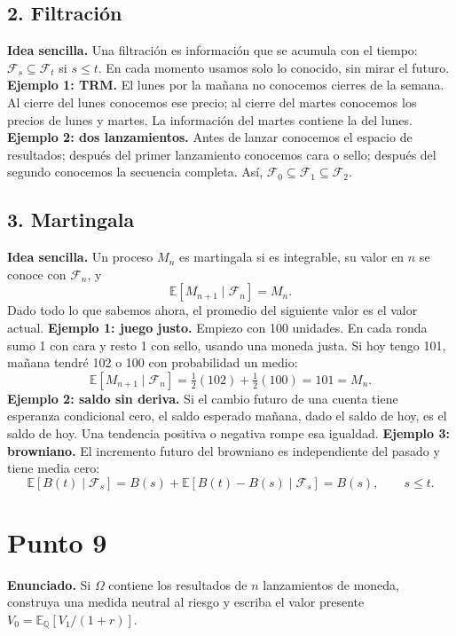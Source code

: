 \documentclass[11pt, a4paper]{article}
\begin{document}
\subsection*{2. Filtración}
\textbf{Idea sencilla.} Una filtración es información que se acumula con el tiempo: \(\mathcal{F}_s\subseteq\mathcal{F}_t\) si \(s\le t\). En cada momento usamos solo lo conocido, sin mirar el futuro.
\textbf{Ejemplo 1: TRM.} El lunes por la mañana no conocemos cierres de la semana. Al cierre del lunes conocemos ese precio; al cierre del martes conocemos los precios de lunes y martes. La información del martes contiene la del lunes.
\textbf{Ejemplo 2: dos lanzamientos.} Antes de lanzar conocemos el espacio de resultados; después del primer lanzamiento conocemos cara o sello; después del segundo conocemos la secuencia completa. Así, \(\mathcal{F}_0\subseteq\mathcal{F}_1\subseteq\mathcal{F}_2\).

\subsection*{3. Martingala}
\textbf{Idea sencilla.} Un proceso \(M_n\) es martingala si es integrable, su valor en \(n\) se conoce con \(\mathcal{F}_n\), y
\[
\mathbb{E}[M_{n+1}\mid\mathcal{F}_n]=M_n.
\]
Dado todo lo que sabemos ahora, el promedio del siguiente valor es el valor actual.
\textbf{Ejemplo 1: juego justo.} Empiezo con 100 unidades. En cada ronda sumo 1 con cara y resto 1 con sello, usando una moneda justa. Si hoy tengo 101, mañana tendré 102 o 100 con probabilidad un medio:
\[
\mathbb{E}[M_{n+1}\mid\mathcal{F}_n]=\tfrac12(102)+\tfrac12(100)=101=M_n.
\]
\textbf{Ejemplo 2: saldo sin deriva.} Si el cambio futuro de una cuenta tiene esperanza condicional cero, el saldo esperado mañana, dado el saldo de hoy, es el saldo de hoy. Una tendencia positiva o negativa rompe esa igualdad.
\textbf{Ejemplo 3: browniano.} El incremento futuro del browniano es independiente del pasado y tiene media cero:
\[
\mathbb{E}[B(t)\mid\mathcal{F}_s]
=B(s)+\mathbb{E}[B(t)-B(s)\mid\mathcal{F}_s]=B(s),\qquad s\le t.
\]
\newpage
\section*{Punto 9}
\textbf{Enunciado.} Si \(\Omega\) contiene los resultados de \(n\) lanzamientos de moneda, construya una medida neutral al riesgo y escriba el valor presente \(V_0=\mathbb{E}_{\mathbb{Q}}[V_1/(1+r)]\).
\end{document}
